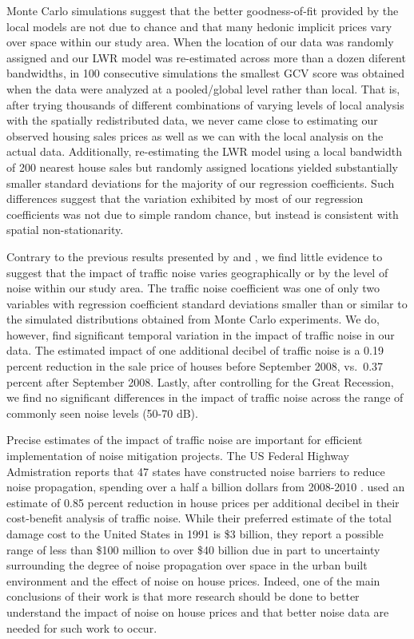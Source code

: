 \documentclass{article}\usepackage{graphicx, color}
\begin{document}
Monte Carlo simulations suggest that the better goodness-of-fit provided by the local models are not due to chance and that many hedonic implicit prices vary over space within our study area. When the location of our data was randomly assigned and our LWR model was re-estimated across more than a dozen diferent bandwidths, in 100 consecutive simulations the smallest GCV score was obtained when the data were analyzed at a pooled/global level rather than local. That is, after trying thousands of different combinations of varying levels of local analysis with the spatially redistributed data, we never came close to estimating our observed housing sales prices as well as we can with the local analysis on the actual data. Additionally, re-estimating the LWR model using a local bandwidth of 200 nearest house sales but randomly assigned locations yielded substantially smaller standard deviations for the majority of our regression coefficients. Such differences suggest that the variation exhibited by most of our regression coefficients was not due to simple random chance, but instead is consistent with spatial non-stationarity. 

Contrary to the previous results presented by \citet{MarmolejoDuarteCarlos;GonzalezTamez2009} and \citet{Theebe2004a}, we find little evidence to suggest that the impact of traffic noise varies geographically or by the level of noise within our study area. The traffic noise coefficient was one of only two variables with regression coefficient standard deviations smaller than or similar to the simulated distributions obtained from Monte Carlo experiments. We do, however, find significant temporal variation in the impact of traffic noise in our data. The estimated impact of one additional decibel of traffic noise is a 0.19 percent reduction in the sale price of houses before September 2008, vs.\ 0.37 percent after September 2008. Lastly, after controlling for the Great Recession, we find no significant differences in the impact of traffic noise across the range of commonly seen noise levels (50-70 dB).

Precise estimates of the impact of traffic noise are important for efficient implementation of noise mitigation projects. The US Federal Highway Admistration reports that 47 states have constructed noise barriers to reduce noise propagation, spending over a half a billion dollars from 2008-2010 . \citet{Delucchi1998} used an estimate of 0.85 percent reduction in house prices per additional decibel in their cost-benefit analysis of traffic noise. While their preferred estimate of the total damage cost to the United States in 1991 is \$3 billion, they report a possible range of less than \$100 million to over \$40 billion due in part to uncertainty surrounding the degree of noise propagation over space in the urban built environment and the effect of noise on house prices. Indeed, one of the main conclusions of their work is that more research should be done to better understand the impact of noise on house prices and that better noise data are needed for such work to occur. 
\end{document}
